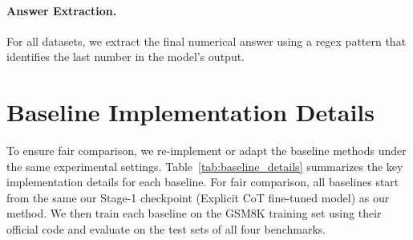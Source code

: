 \documentclass{article}
\theoremstyle{plain}
\theoremstyle{definition}
\theoremstyle{remark}
\begin{document}
\paragraph{Answer Extraction.}
For all datasets, we extract the final numerical answer using a regex pattern that identifies the last number in the model's output.

\section{Baseline Implementation Details}
\label{app:baselines}

To ensure fair comparison, we re-implement or adapt the baseline methods under the same experimental settings. Table~\ref{tab:baseline_details} summarizes the key implementation details for each baseline. For fair comparison, all baselines start from the
same our Stage-1 checkpoint (Explicit CoT fine-tuned model) as our method. We then train each baseline on the GSM8K training set using their official code and evaluate on the test sets of all four benchmarks.

\begin{table}[h]
\centering
{}
\caption{Key Implementation details for baseline methods.}
\label{tab:baseline_details}
\end{table}
\end{document}
